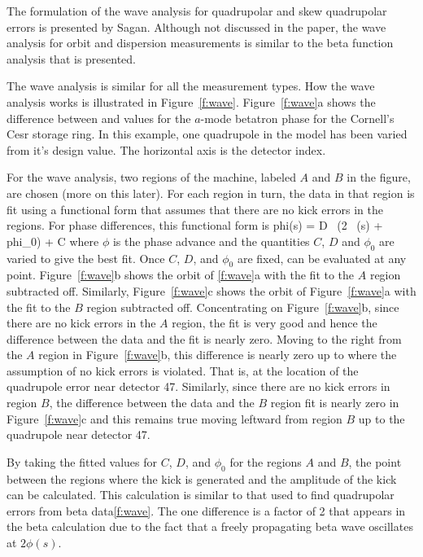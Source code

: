 The formulation of the wave analysis for quadrupolar and skew
quadrupolar errors is presented by Sagan\cite{b:wave}.  Although not
discussed in the paper, the wave analysis for orbit and dispersion
measurements is similar to the beta function analysis that is
presented. 

The wave analysis is similar for all the measurement types. How the
wave analysis works is illustrated in Figure~\ref{f:wave}.
Figure~\ref{f:wave}a shows the difference between 
and  values for the $a$-mode betatron phase for the Cornell's 
Cesr storage ring. In this example, one quadrupole in the model has 
been varied from it's design value. The horizontal axis is the detector index. 

For the wave analysis, two regions of the machine, labeled $A$ and $B$
in the figure, are chosen (more on this later). For each region in
turn, the data in that region is fit using a functional form that
assumes that there are no kick errors in the regions. 
For phase differences, this functional form is
\Begineq
  \delta phi(s) = D \, \sin(2 \, \phi(s) + phi_0) + C
  \label{xabps}
\Endeq
where $\phi$ is the phase
advance and the quantities $C$, $D$ and $\phi_0$ are varied to give the best
fit.  Once $C$, $D$, and $\phi_0$ are fixed,  can be evaluated at
any point. Figure~\ref{f:wave}b shows the orbit of \ref{f:wave}a
with the fit to the $A$ region subtracted off. Similarly,
Figure~\ref{f:wave}c shows the orbit of Figure~\ref{f:wave}a with
the fit to the $B$ region subtracted off. Concentrating on
Figure~\ref{f:wave}b, since there are no kick errors in the $A$
region, the fit is very good and hence the difference between the data
and the fit is nearly zero. Moving to the right from the $A$ region in
Figure~\ref{f:wave}b, this difference is nearly zero up to where the
assumption of no kick errors is violated. That is, at the location of
the quadrupole error  near detector 47. Similarly, since there are no kick errors
in region $B$, the difference between the data and the $B$ region fit
is nearly zero in Figure~\ref{f:wave}c and this remains true moving leftward
from region $B$ up to the quadrupole near detector 47.

By taking the fitted values for $C$, $D$, and $\phi_0$ for the regions $A$
and $B$, the point between the regions where the kick is generated and
the amplitude of the kick can be calculated. This calculation is
similar to that used to find quadrupolar errors from beta
data\ref{f:wave}. The one difference is a factor of 2 that appears
in the beta calculation due to the fact that a freely propagating beta
wave oscillates at $2\phi(s)$. 

